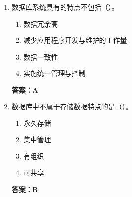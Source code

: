 \documentclass[12pt, a4paper]{article}
\begin{document}
\begin{enumerate}[label=\arabic*.]
	\item 数据库系统具有的特点不包括（\quad）。
	      \begin{enumerate}
		      \item 数据冗余高
		      \item 减少应用程序开发与维护的工作量
		      \item 数据一致性
		      \item 实施统一管理与控制
	      \end{enumerate}
	      \textbf{答案：A}

	\item 数据库中不属于存储数据特点的是（\quad）。
	      \begin{enumerate}
		      \item 永久存储
		      \item 集中管理
		      \item 有组织
		      \item 可共享
	      \end{enumerate}
	      \textbf{答案：B}
\end{enumerate}
\end{document}

